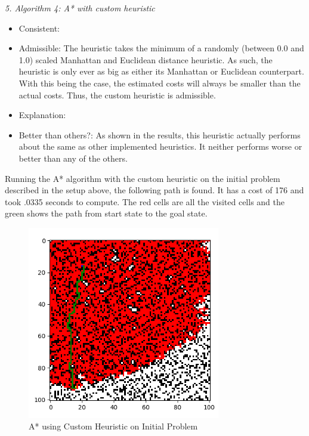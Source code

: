 \documentclass[a4paper]{article}
\begin{document}
\textit{5. Algorithm 4: A* with custom heuristic}
\begin{itemize}
    \item Consistent: 
    \item Admissible: The heuristic takes the minimum of a randomly (between 0.0 and 1.0) scaled Manhattan and Euclidean distance heuristic. As such, the heuristic is only ever as big as either its Manhattan or Euclidean counterpart. With this being the case, the estimated costs will always be smaller than the actual costs. Thus, the custom heuristic is admissible.
    \item Explanation:
    \item Better than others?: As shown in the results, this heuristic actually performs about the same as other implemented heuristics. It neither performs worse or better than any of the others.
\end{itemize}
Running the A* algorithm with the custom heuristic on the initial problem described in the setup above, the following path is found. It has a cost of 176 and took .0335 seconds to compute. The red cells are all the visited cells and the green shows the path from start state to the goal state.


\begin{figure}[ht]
    \centering
    \includegraphics[width=0.75\textwidth]{fig6.png}
    \caption{A* using Custom Heuristic on Initial Problem}
    \label{fig:custom}
\end{figure}

\newpage
\end{document}
